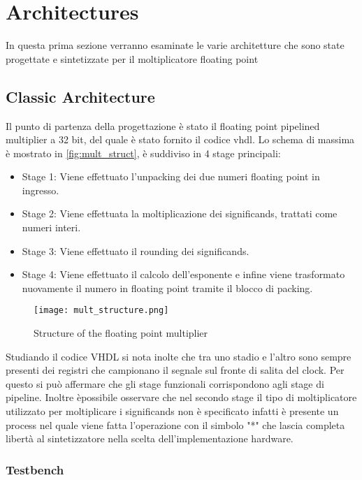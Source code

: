 \section{Architectures}
In questa prima sezione verranno esaminate le varie architetture che sono state progettate e sintetizzate per il moltiplicatore floating point

\subsection{Classic Architecture}
Il punto di partenza della progettazione è stato il floating point pipelined multiplier a 32 bit, del quale è stato fornito il codice vhdl.
Lo schema di massima è mostrato in \autoref{fig:mult_struct}, è suddiviso in 4 stage principali:
\begin{itemize}
\item Stage 1: Viene effettuato l'unpacking dei due numeri floating point in ingresso.
\item Stage 2: Viene effettuata la moltiplicazione dei significands, trattati come numeri interi.
\item Stage 3: Viene effettuato il rounding dei significands.
\item Stage 4: Viene effettuato il calcolo dell'esponente e infine viene trasformato nuovamente il numero in floating point tramite il blocco di packing.
\end{itemize}

\begin{figure}[h]
	\center
	\texttt{[image: mult\_structure.png]}
	\caption{Structure of the floating point multiplier}
	\label{fig:mult_struct}
\end{figure}

\noindent Studiando il codice VHDL si nota inolte che tra uno stadio e l'altro sono sempre presenti dei registri che campionano il segnale sul fronte di salita del clock. Per questo si può affermare che gli stage funzionali corrispondono agli stage di pipeline.
Inoltre èpossibile osservare che nel secondo stage il tipo di moltiplicatore utilizzato per moltiplicare i significands non è specificato infatti è presente un process nel quale viene fatta l'operazione con il simbolo "*" che lascia completa libertà al sintetizzatore nella scelta dell'implementazione hardware.

\subsubsection{Testbench}

